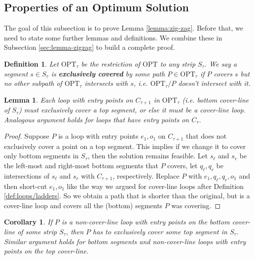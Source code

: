\documentclass[pdflatex,sn-mathphys-num]{sn-jnl}
\theoremstyle{thmstyleone}
\newtheorem{lemma}{Lemma}
\newtheorem{corollary}{Corollary}
\newtheorem{definition}{Definition} %
\newcommand{\OPT}{{\text{OPT}}}
\begin{document}
\subsection{Properties of an Optimum Solution}\label{sec:zig-zag-lem}
The goal of this subsection is to prove Lemma \ref{lemma:zig-zag}. Before that,
we need to state some further lemmas and definitions. We combine these in Subsection \ref{sec:lemma-zigzag} to build a complete proof.

\begin{definition}\label{def:exclusively-cover}
    Let $\OPT_\tau$ be the restriction of $\OPT$ to any strip $S_\tau$.
    We say a segment $s \in S_\tau$ is \textbf{exclusively covered} by some path $P\in \OPT_\tau$ if $P$ covers $s$ but no other subpath of $\OPT_\tau$ intersects with $s$, i.e. $\OPT_\tau/P$ doesn't intersect with it.
\end{definition}

\begin{lemma}\label{lem:cover-line-loop}
    Each loop with entry points on $C_{\tau+1}$ in $\OPT_\tau$ (i.e. bottom cover-line of $S_\tau$) must exclusively cover a top segment, or else it must be a cover-line loop. Analogous argument holds for loops that have entry points on $C_\tau$.
\end{lemma}
\begin{proof}
    Suppose $P$ is a loop with entry points $e_1,o_1$ on $C_{\tau+1}$ that does not exclusively cover a point on a top segment. This implies if we change it to cover only bottom segments in $S_\tau$, then the solution remains feasible. Let $s_\ell$ and $s_r$ be the left-most and right-most bottom segments that $P$ covers, let $q_\ell,q_r$ be intersections of $s_\ell$ and $s_r$ with $C_{\tau+1}$, respectively. Replace $P$ with $e_1,q_\ell,q_r,o_1$ and then short-cut $e_1,o_1$ like the way we argued for cover-line loops after Definition \ref{def:loops/ladders}.
    So we obtain a path that is shorter than the original, but is a cover-line loop and covers all the (bottom) segments $P$ was covering.
\end{proof}
\begin{corollary}\label{cor:non-cover-line-loop-top-segment}
    If $P$ is a non-cover-line loop with entry points on the bottom cover-line of some strip $S_\tau$, then $P$ has to exclusively cover some top segment in $S_\tau$. Similar argument holds for bottom segments and non-cover-line loops with entry points on the top cover-line.
\end{corollary}
\end{document}
